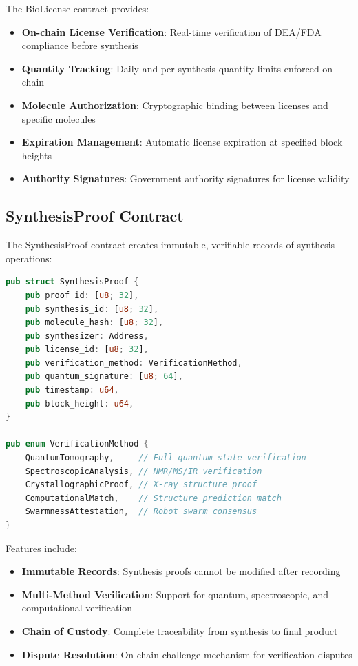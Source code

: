 \documentclass[12pt,a4paper]{article}
\begin{document}
The BioLicense contract provides:

\begin{itemize}
    \item \textbf{On-chain License Verification}: Real-time verification of DEA/FDA compliance before synthesis
    \item \textbf{Quantity Tracking}: Daily and per-synthesis quantity limits enforced on-chain
    \item \textbf{Molecule Authorization}: Cryptographic binding between licenses and specific molecules
    \item \textbf{Expiration Management}: Automatic license expiration at specified block heights
    \item \textbf{Authority Signatures}: Government authority signatures for license validity
\end{itemize}

\subsection{SynthesisProof Contract}

The SynthesisProof contract creates immutable, verifiable records of synthesis operations:

\begin{lstlisting}[language=Rust,caption={SynthesisProof contract interface}]
pub struct SynthesisProof {
    pub proof_id: [u8; 32],
    pub synthesis_id: [u8; 32],
    pub molecule_hash: [u8; 32],
    pub synthesizer: Address,
    pub license_id: [u8; 32],
    pub verification_method: VerificationMethod,
    pub quantum_signature: [u8; 64],
    pub timestamp: u64,
    pub block_height: u64,
}

pub enum VerificationMethod {
    QuantumTomography,     // Full quantum state verification
    SpectroscopicAnalysis, // NMR/MS/IR verification
    CrystallographicProof, // X-ray structure proof
    ComputationalMatch,    // Structure prediction match
    SwarmnessAttestation,  // Robot swarm consensus
}
\end{lstlisting}

Features include:

\begin{itemize}
    \item \textbf{Immutable Records}: Synthesis proofs cannot be modified after recording
    \item \textbf{Multi-Method Verification}: Support for quantum, spectroscopic, and computational verification
    \item \textbf{Chain of Custody}: Complete traceability from synthesis to final product
    \item \textbf{Dispute Resolution}: On-chain challenge mechanism for verification disputes
\end{itemize}
\end{document}
